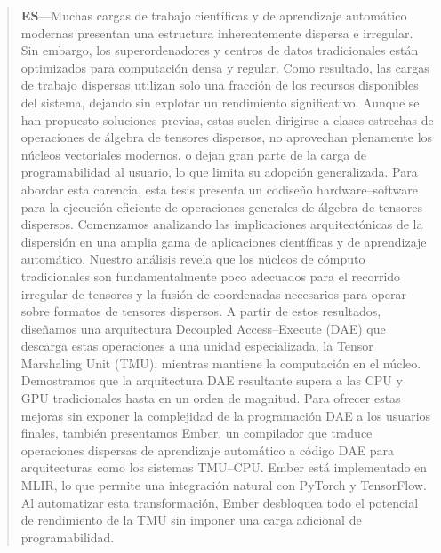 \begin{abstract}
\textbf{ES}---Muchas cargas de trabajo científicas y de aprendizaje automático modernas presentan una estructura inherentemente dispersa e irregular. Sin embargo, los superordenadores y centros de datos tradicionales están optimizados para computación densa y regular. Como resultado, las cargas de trabajo dispersas utilizan solo una fracción de los recursos disponibles del sistema, dejando sin explotar un rendimiento significativo. Aunque se han propuesto soluciones previas, estas suelen dirigirse a clases estrechas de operaciones de álgebra de tensores dispersos, no aprovechan plenamente los núcleos vectoriales modernos, o dejan gran parte de la carga de programabilidad al usuario, lo que limita su adopción generalizada. Para abordar esta carencia, esta tesis presenta un codiseño hardware--software para la ejecución eficiente de operaciones generales de álgebra de tensores dispersos. Comenzamos analizando las implicaciones arquitectónicas de la dispersión en una amplia gama de aplicaciones científicas y de aprendizaje automático. Nuestro análisis revela que los núcleos de cómputo tradicionales son fundamentalmente poco adecuados para el recorrido irregular de tensores y la fusión de coordenadas necesarios para operar sobre formatos de tensores dispersos. A partir de estos resultados, diseñamos una arquitectura Decoupled Access--Execute (DAE) que descarga estas operaciones a una unidad especializada, la Tensor Marshaling Unit (TMU), mientras mantiene la computación en el núcleo. Demostramos que la arquitectura DAE resultante supera a las CPU y GPU tradicionales hasta en un orden de magnitud. Para ofrecer estas mejoras sin exponer la complejidad de la programación DAE a los usuarios finales, también presentamos Ember, un compilador que traduce operaciones dispersas de aprendizaje automático a código DAE para arquitecturas como los sistemas TMU--CPU. Ember está implementado en MLIR, lo que permite una integración natural con PyTorch y TensorFlow. Al automatizar esta transformación, Ember desbloquea todo el potencial de rendimiento de la TMU sin imponer una carga adicional de programabilidad.
\end{abstract}
